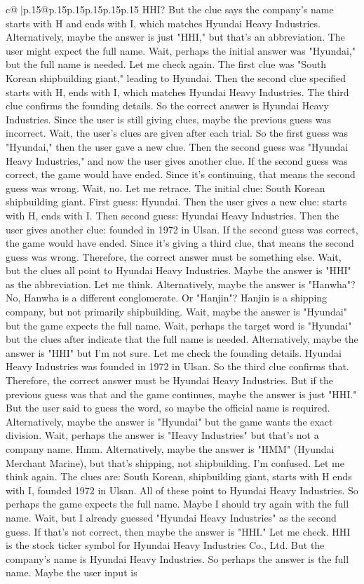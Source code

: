 \documentclass{article}
\begin{document}
{\begin{supertabular}{c@{$\;$}|p{.15\linewidth}@{}p{.15\linewidth}p{.15\linewidth}p{.15\linewidth}p{.15\linewidth}p{.15\linewidth}}
{{{HHI? But the clue says the company's name starts with H and ends with I, which matches Hyundai Heavy Industries. Alternatively, maybe the answer is just "HHI," but that's an abbreviation. The user might expect the full name. Wait, perhaps the initial answer was "Hyundai," but the full name is needed. Let me check again. The first clue was "South Korean shipbuilding giant," leading to Hyundai. Then the second clue specified starts with H, ends with I, which matches Hyundai Heavy Industries. The third clue confirms the founding details. So the correct answer is Hyundai Heavy Industries. Since the user is still giving clues, maybe the previous guess was incorrect. Wait, the user's clues are given after each trial. So the first guess was "Hyundai," then the user gave a new clue. Then the second guess was "Hyundai Heavy Industries," and now the user gives another clue. If the second guess was correct, the game would have ended. Since it's continuing, that means the second guess was wrong. Wait, no. Let me retrace. The initial clue: South Korean shipbuilding giant. First guess: Hyundai. Then the user gives a new clue: starts with H, ends with I. Then second guess: Hyundai Heavy Industries. Then the user gives another clue: founded in 1972 in Ulsan. If the second guess was correct, the game would have ended. Since it's giving a third clue, that means the second guess was wrong. Therefore, the correct answer must be something else. Wait, but the clues all point to Hyundai Heavy Industries. Maybe the answer is "HHI" as the abbreviation. Let me think. Alternatively, maybe the answer is "Hanwha"? No, Hanwha is a different conglomerate. Or "Hanjin"? Hanjin is a shipping company, but not primarily shipbuilding. Wait, maybe the answer is "Hyundai" but the game expects the full name. Wait, perhaps the target word is "Hyundai" but the clues after indicate that the full name is needed. Alternatively, maybe the answer is "HHI" but I'm not sure. Let me check the founding details. Hyundai Heavy Industries was founded in 1972 in Ulsan. So the third clue confirms that. Therefore, the correct answer must be Hyundai Heavy Industries. But if the previous guess was that and the game continues, maybe the answer is just "HHI." But the user said to guess the word, so maybe the official name is required. Alternatively, maybe the answer is "Hyundai" but the game wants the exact division. Wait, perhaps the answer is "Heavy Industries" but that's not a company name. Hmm. Alternatively, maybe the answer is "HMM" (Hyundai Merchant Marine), but that's shipping, not shipbuilding. I'm confused. Let me think again. The clues are: South Korean, shipbuilding giant, starts with H ends with I, founded 1972 in Ulsan. All of these point to Hyundai Heavy Industries. So perhaps the game expects the full name. Maybe I should try again with the full name. Wait, but I already guessed "Hyundai Heavy Industries" as the second guess. If that's not correct, then maybe the answer is "HHI." Let me check. HHI is the stock ticker symbol for Hyundai Heavy Industries Co., Ltd. But the company's name is Hyundai Heavy Industries. So perhaps the answer is the full name. Maybe the user input is }}}
\end{supertabular}}
\end{document}
